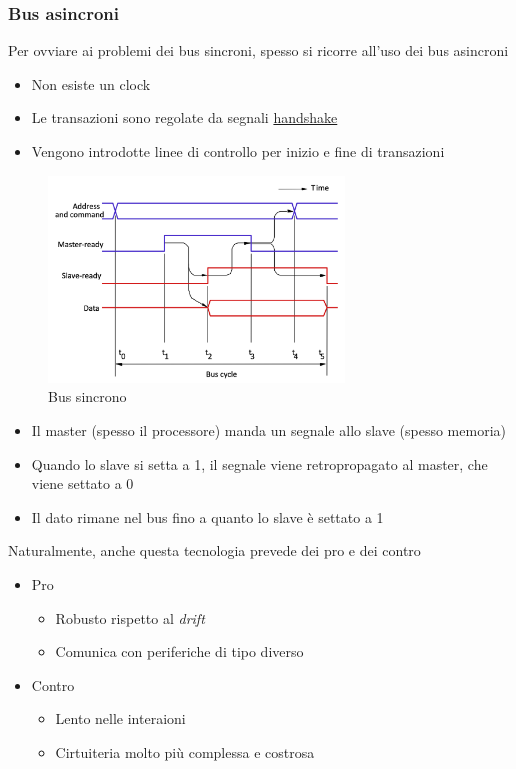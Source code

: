 \subsubsection*{Bus asincroni}
Per ovviare ai problemi dei bus sincroni, spesso si ricorre all'uso dei bus asincroni
\begin{itemize}
	\item Non esiste un clock
	\item Le transazioni sono regolate da segnali \underline{handshake}
	\item Vengono introdotte linee di controllo per inizio e fine di transazioni
\end{itemize}
\begin{figure}[H]
	\begin{center}
		\includegraphics[width = 0.7\textwidth]{Images/Bus asincrono.png}
	\end{center}
	\caption{Bus sincrono}
\end{figure}
\begin{itemize}
	\item Il master (spesso il processore) manda un segnale allo slave (spesso memoria)
	\item Quando lo slave si setta a 1, il segnale viene retropropagato al master, che viene settato a 0
	\item Il dato rimane nel bus fino a quanto lo slave è settato a 1
\end{itemize}
Naturalmente, anche questa tecnologia prevede dei pro e dei contro
\begin{itemize}
	\item Pro
	      \begin{itemize}
		      \item Robusto rispetto al \textit{drift}
		      \item Comunica con periferiche di tipo diverso
	      \end{itemize}
	\item Contro
	      \begin{itemize}
		      \item Lento nelle interaioni
		      \item Cirtuiteria molto più complessa e costrosa
	      \end{itemize}
\end{itemize}
